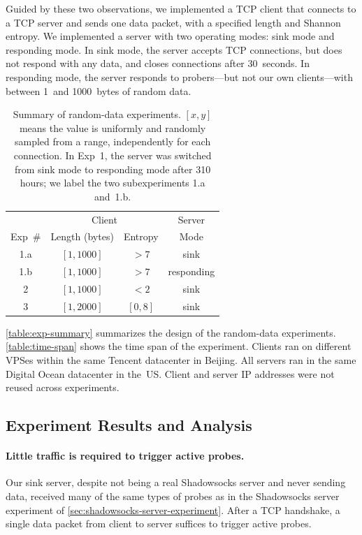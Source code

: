 \documentclass[sigconf,letterpaper]{acmart}
\begin{document}
Guided by these two observations,
we implemented a TCP client that connects to a TCP server
and sends one data packet, with a specified length and Shannon entropy.
We implemented a server with two operating modes:
sink mode and responding mode.
In sink mode,
the server accepts TCP connections, but does not respond with any data, and closes connections after 30~seconds.
In responding mode,
the server responds to probers---but not our own clients---with
between 1~and 1000~bytes of random data.

\begin{table}
    \caption{
        Summary of random-data experiments.
        $[x, y]$ means the value is uniformly and randomly sampled from a range, independently for each connection.
        In Exp~1, the server was switched from sink mode to responding mode after 310 hours;
        we label the two subexperiments 1.a and~1.b.
    }
    \label{table:exp-summary}
    \begin{tabular}{c|cc|c}
                              & \multicolumn{2}{c|}{Client} & Server     \\
        Exp~\#                & Length (bytes) & Entropy    & Mode       \\ \hline
        1.a                   & $[1, 1000]$    & $>7$       & sink       \\ \hline
        1.b                   & $[1, 1000]$    & $>7$       & responding \\ \hline
        2\phantom{.a}         & $[1, 1000]$    & $<2$       & sink       \\ \hline
        3\phantom{.a}         & $[1, 2000]$    & $[0,8]$    & sink       \\ \hline
    \end{tabular}
\end{table}

\autoref{table:exp-summary} summarizes the design of the random-data experiments.
\autoref{table:time-span} shows the time span of the experiment.
Clients ran on different VPSes within the same Tencent datacenter in Beijing.
All servers ran in the same Digital Ocean datacenter in the~US.
Client and server IP addresses were not reused across experiments.

\subsection{Experiment Results and Analysis}
\label{sec:traffic-analysis-result}

\paragraph{Little traffic is required to trigger active probes.}
Our sink server, despite not being a real Shadowsocks server
and never sending data,
received many of the same types of probes
as in the Shadowsocks server experiment of \autoref{sec:shadowsocks-server-experiment}.
After a TCP handshake, a single data packet from client to server suffices to trigger active probes.
\end{document}
